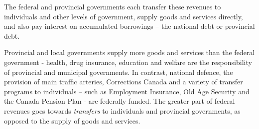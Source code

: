 



The federal and provincial governments each transfer these revenues to individuals and other levels of government, supply goods and services directly, and also pay interest on accumulated borrowings -- the national debt or provincial debt.

Provincial and local governments supply more goods and services than the federal government - health, drug insurance, education and welfare are the responsibility of provincial and municipal governments. In contrast, national defence, the provision of main traffic arteries, Corrections Canada and a variety of transfer programs to individuals -- such as Employment Insurance, Old Age Security and the Canada Pension Plan - are federally funded. The greater part of federal revenues goes towards \textit{transfers} to individuals and provincial governments, as opposed to the supply of goods and services.